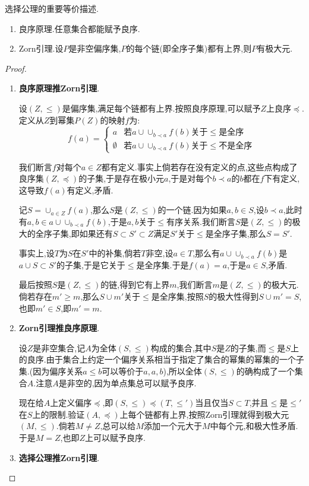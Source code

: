 选择公理的重要等价描述.
\begin{enumerate}
	\item 良序原理.任意集合都能赋予良序.
	\item Zorn引理.设$P$是非空偏序集,$P$的每个链(即全序子集)都有上界,则$P$有极大元.
\end{enumerate}
\begin{proof}
	\begin{enumerate}
		\item\textbf{良序原理推Zorn引理}.
		
		设$(Z,\le)$是偏序集,满足每个链都有上界.按照良序原理,可以赋予$Z$上良序$\preceq$.定义从$Z$到幂集$P(Z)$的映射$f$为:
		$$f(a)=\left\{\begin{array}{cc}
		{a}& \text{若}{a}\cup\cup_{b\prec a}f(b)\text{关于}\le\text{是全序}\\
		\emptyset&\text{若}{a}\cup\cup_{b\prec a}f(b)\text{关于}\le\text{不是全序}
		\end{array}\right.$$
		
		我们断言$f$对每个$a\in Z$都有定义.事实上倘若存在没有定义的点,这些点构成了良序集$(Z,\preceq)$的子集,于是存在极小元$a$,于是对每个$b\prec a$的$b$都在$f$下有定义,这导致$f(a)$有定义,矛盾.
		
		记$S=\cup_{a\in Z}f(a)$,那么$S$是$(Z,\le)$的一个链.因为如果$a,b\in S$,设$b\prec a$,此时有$a,b\in{a}\cup\cup_{b\prec a}f(b)$,于是$a,b$关于$\le$有序关系.我们断言$S$是$(Z,\le)$的极大的全序子集,即如果还有$S\subset S'\subset Z$满足$S'$关于$\le$是全序子集,那么$S=S'$.
		
		事实上,设$T$为$S$在$S'$中的补集,倘若$T$非空,设$a\in T$,那么有${a}\cup\cup_{b\prec a}f(b)$是${a}\cup S\subset S'$的子集,于是它关于$\le$是全序集.于是$f(a)={a}$,于是$a\in S$,矛盾.
		
		最后按照$S$是$(Z,\le)$的链,得到它有上界$m$,我们断言$m$是$(Z,\le)$的极大元.倘若存在$m'\ge m$,那么$S\cup{m'}$关于$\le$是全序集,按照$S$的极大性得到$S\cup{m'}=S$,也即$m'\in S$,即$m'=m$.
		\item\textbf{Zorn引理推良序原理}.
		
		设$Z$是非空集合,记$A$为全体$(S,\le)$构成的集合,其中$S$是$Z$的子集,而$\le$是$S$上的良序.由于集合上约定一个偏序关系相当于指定了集合的幂集的幂集的一个子集.(因为偏序关系$a\le b$可以等价于${{a},{a,b}}$),所以全体$(S,\le)$的确构成了一个集合$A$.注意$A$是非空的,因为单点集总可以赋予良序.
		
		现在给$A$上定义偏序$\preceq$,即$(S,\le)\preceq(T,\le')$当且仅当$S\subset T$,并且$\le$是$\le'$在$S$上的限制.验证$(A,\preceq)$上每个链都有上界,按照Zorn引理就得到极大元$(M,\le)$.倘若$M\not=Z$,总可以给$M$添加一个元大于$M$中每个元,和极大性矛盾.于是$M=Z$,也即$Z$上可以赋予良序.
		\item\textbf{选择公理推Zorn引理}.
		

\end{enumerate}
\end{proof}

